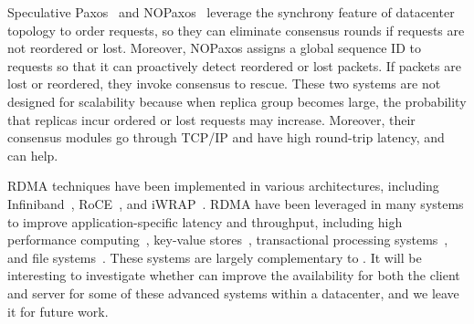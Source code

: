 Speculative Paxos~\cite{specpaxos:nsdi15} and NOPaxos~\cite{nopaxos:osdi16} 
leverage the synchrony feature of datacenter topology to order requests, so 
they can eliminate consensus rounds if requests are not reordered or lost. 
Moreover, NOPaxos assigns a global sequence ID to requests so that it can 
proactively detect reordered or lost packets. If packets are lost or 
reordered, they invoke consensus to rescue. These two systems are not designed 
for scalability because when replica group becomes large, the probability that 
replicas incur ordered or lost requests may increase. Moreover, their consensus 
modules go through TCP/IP and have high round-trip latency, and \xxx can help.

 RDMA techniques have been implemented in various 
architectures, including Infiniband~\cite{infiniband}, RoCE~\cite{roce}, and 
iWRAP~\cite{iwrap}. RDMA have been leveraged in many systems to improve 
application-specific latency and throughput, including high performance 
computing~\cite{openmpi}, key-value 
stores~\cite{pilaf:usenix14,herd:sigcomm14,farm:nsdi14,memcached:rdma}, 
transactional processing systems~\cite{drtm:sosp15,farm:sosp15}, and file 
systems~\cite{gibson:nfs}. These systems are largely complementary to \xxx. It 
will be interesting to investigate whether \xxx can improve the availability for 
both the client and server for some of these advanced systems within a 
datacenter, and we leave it for future work.





